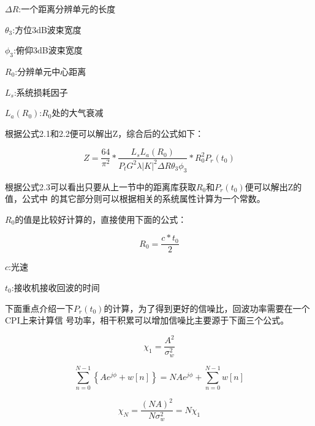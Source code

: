 \documentclass[a4paper,12pt]{report}
\begin{document}
\begin{spacing}{1.5}
\begin{proposition}[体散射雷达方程]
    $\Delta R$:一个距离分辨单元的长度

    $\theta_3$:方位3dB波束宽度

    $\phi_3$:俯仰3dB波束宽度

    $R_0$:分辨单元中心距离

    $L_s$:系统损耗因子

    $L_a(R_0)$:$R_0$处的大气衰减
\end{proposition}

根据公式2.1和2.2便可以解出Z，综合后的公式如下：
\begin{proposition}[体散射雷达方程]

    \begin{equation}
        Z=\frac{64}{\pi^2}*\frac{L_sL_a\left(R_0\right)}
            {P_tG^2\lambda|K|^2\Delta R\theta_3\phi_3}*R_0^2P_r(t_0)
    \end{equation}

\end{proposition}

根据公式2.3可以看出只要从上一节中的距离库获取$R_0$和$P_r(t_0)$便可以解出Z的值，公式中
的其它部分则可以根据相关的系统属性计算为一个常数。

$R_0$的值是比较好计算的，直接使用下面的公式：
\begin{proposition}[目标距离计算]

    \begin{equation}
        R_0=\frac{c*t_0}{2} 
    \end{equation}

    $c$:光速

    $t_0$:接收机接收回波的时间

\end{proposition}

下面重点介绍一下$P_r(t_0)$的计算，为了得到更好的信噪比，回波功率需要在一个CPI上来计算信
号功率，相干积累可以增加信噪比主要源于下面三个公式。

\begin{proposition}[相干积累]

    \begin{equation}
        \chi_1=\frac{A^2}{\sigma_w^2}
    \end{equation}

    \begin{equation}
        \sum_{n=0}^{N-1}\left\{Ae^{j\phi}+w\left[n\right]\right\}=NAe^{j\phi}+\sum_{n=0}^{N-1}w\left[n\right]
    \end{equation}

    \begin{equation}
        \chi_N=\frac{(NA)^2}{N\sigma_w^2}=N\chi_1
    \end{equation}


\end{proposition}
\end{spacing}
\end{document}
